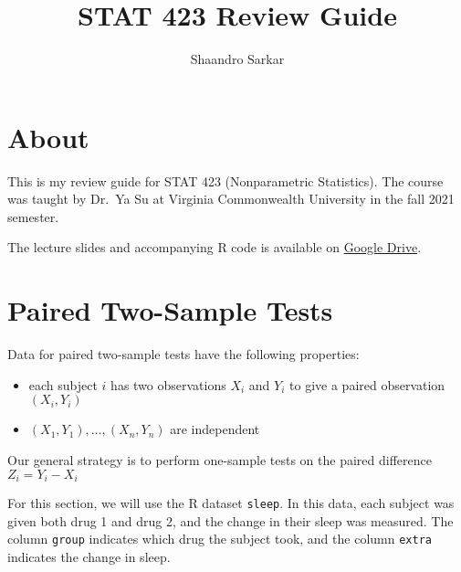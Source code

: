 \documentclass[
]{book}
\title{STAT 423 Review Guide}
\author{Shaandro Sarkar}
\date{}
\newenvironment{Shaded}{\begin{snugshade}}{\end{snugshade}}
\newcommand{\CommentTok}[1]{\textcolor[rgb]{0.56,0.35,0.01}{\textit{#1}}}
\newcommand{\DecValTok}[1]{\textcolor[rgb]{0.00,0.00,0.81}{#1}}
\newcommand{\KeywordTok}[1]{\textcolor[rgb]{0.13,0.29,0.53}{\textbf{#1}}}
\newcommand{\NormalTok}[1]{#1}
\newcommand{\OperatorTok}[1]{\textcolor[rgb]{0.81,0.36,0.00}{\textbf{#1}}}
\newcommand{\StringTok}[1]{\textcolor[rgb]{0.31,0.60,0.02}{#1}}
\providecommand{\tightlist}{%
  \setlength{\itemsep}{0pt}\setlength{\parskip}{0pt}}
\begin{document}
\maketitle

{
\setcounter{tocdepth}{1}
\tableofcontents
}
\hypertarget{about}{%
\chapter*{About}\label{about}}

This is my review guide for STAT 423 (Nonparametric Statistics).
The course was taught by Dr.~Ya Su at Virginia Commonwealth University in the fall 2021 semester.

The lecture slides and accompanying R code is available on
\href{https://drive.google.com/drive/folders/1Wvj3ytoPHZRaQbCHw11FjkdGLqIFLlfo?usp=sharing}{Google Drive}.

\hypertarget{paired-two-sample-tests}{%
\chapter{Paired Two-Sample Tests}\label{paired-two-sample-tests}}

Data for paired two-sample tests have the following properties:

\begin{itemize}
\tightlist
\item
  each subject \(i\) has two observations \(X_i\) and \(Y_i\) to give a paired observation \((X_i, Y_i)\)
\item
  \((X_1, Y_1), \dots, (X_n, Y_n)\) are independent
\end{itemize}

Our general strategy is to perform one-sample tests on the paired difference \(Z_i = Y_i - X_i\)

For this section, we will use the R dataset \texttt{sleep}.
In this data, each subject was given both drug 1 and drug 2,
and the change in their sleep was measured.
The column \texttt{group} indicates which drug the subject took,
and the column \texttt{extra} indicates the change in sleep.

\begin{Shaded}
\end{Shaded}
\end{document}
